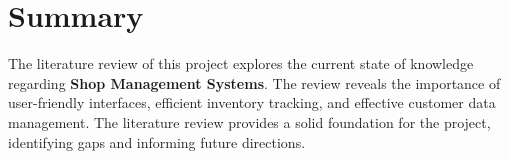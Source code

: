 \section{Summary}
The literature review of this project explores the current state of knowledge regarding \textbf{Shop Management Systems}. The review reveals the importance of user-friendly interfaces, efficient inventory tracking, and effective customer data management. The literature review provides a solid foundation for the project, identifying gaps and informing future directions.
